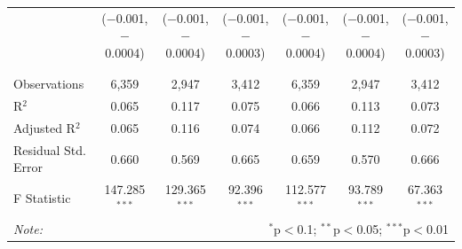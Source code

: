 \documentclass[alpha-refs]{wiley-article-01g}
\begin{document}
\begin{landscape}
\begin{table}[!htbp]
\begin{tabular}{@{\extracolsep{5pt}}lcccccc}
			& ($-$0.001, $-$0.0004) & ($-$0.001, $-$0.0004) & ($-$0.001, $-$0.0003) & ($-$0.001, $-$0.0004) & ($-$0.001, $-$0.0004) & ($-$0.001, $-$0.0003) \\ 
			& & & & & & \\ 
			\hline \\[-.8ex] 
			Observations & 6,359 & 2,947 & 3,412 & 6,359 & 2,947 & 3,412 \\ 
			R$^{2}$ & 0.065 & 0.117 & 0.075 & 0.066 & 0.113 & 0.073 \\ 
			Adjusted R$^{2}$ & 0.065 & 0.116 & 0.074 & 0.066 & 0.112 & 0.072 \\ 
			Residual Std. Error & 0.660 & 0.569 & 0.665 & 0.659 & 0.570 & 0.666 \\ 
			F Statistic & 147.285$^{***}$ & 129.365$^{***}$ & 92.396$^{***}$ & 112.577$^{***}$ & 93.789$^{***}$ & 67.363$^{***}$ \\ 
			\hline 
			\textit{Note:}  & \multicolumn{6}{r}{$^{*}$p$<$0.1; $^{**}$p$<$0.05; $^{***}$p$<$0.01} \\ 
		\end{tabular} 
	\end{table} 
	
\end{landscape}

\newpage
\end{document}

